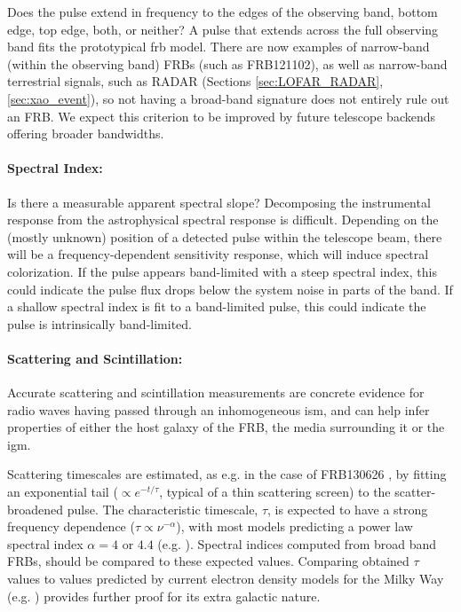 \documentclass[a4paper,fleqn,usenatbib]{mnras}
\begin{document}
Does the pulse extend in frequency to the edges of the observing band, bottom
edge, top edge, both, or neither? A pulse that extends across the full observing
band fits the prototypical \gls{frb} model. There are now examples of
narrow-band (within the observing band) FRBs (such as FRB121102), as well as
narrow-band terrestrial signals, such as RADAR (Sections \ref{sec:LOFAR_RADAR},
\ref{sec:xao_event}), so not having a broad-band signature does not entirely
rule out an FRB. We expect this criterion to be improved by future telescope
backends offering broader bandwidths. 

\paragraph{Spectral Index:}

Is there a measurable apparent spectral slope? Decomposing the instrumental
response from the astrophysical spectral response is difficult.  Depending on
the (mostly unknown) position of a detected pulse within the telescope beam,
there will be a frequency-dependent sensitivity response, which will induce
spectral colorization.  If the pulse appears band-limited with a steep spectral
index, this could indicate the pulse flux drops below the system noise in parts
of the band. If a shallow spectral index is fit to a band-limited pulse, this
could indicate the pulse is intrinsically band-limited.

\paragraph{Scattering and Scintillation:}

Accurate scattering and scintillation measurements are concrete evidence for radio waves having passed through an inhomogeneous \gls{ism}, and can help infer properties of either the host galaxy of the FRB,  the media surrounding it or the \gls{igm}.

Scattering timescales are estimated, as e.g. in the case of FRB130626 \citep{2016MNRAS.460L..30C}, by fitting an exponential tail ($\propto e^{-t/\tau}$, typical of a thin scattering screen) to the scatter-broadened pulse. The characteristic timescale, $\tau$, is expected to have a strong frequency dependence ($\tau \propto \nu^{-\alpha}$), with most models predicting a power law spectral index $\alpha =4$ or $4.4$ (e.g. \citealt{Rickett1977}). Spectral indices computed from broad band FRBs, should be compared to these expected values. Comparing obtained $\tau$ values to values predicted by current electron density models for the Milky Way (e.g. \citealt{2002astro.ph..7156C,2017ApJ...835...29Y}) provides further proof for its extra galactic nature.
\end{document}
